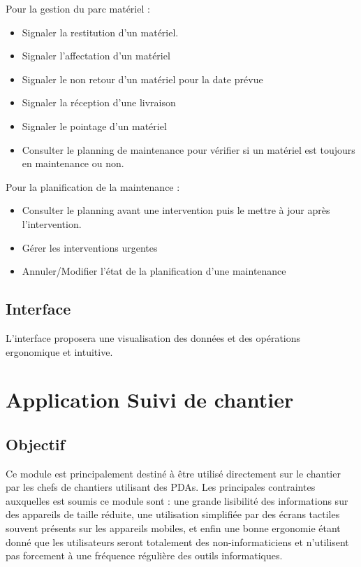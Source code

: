         Pour la gestion du parc matériel :
               \begin{itemize}
	               \item Signaler la restitution d'un matériel.
	               \item Signaler l'affectation d'un matériel
	               \item Signaler le non retour d'un matériel pour la date prévue
	               \item Signaler la réception d'une livraison
	               \item Signaler le pointage d'un matériel
	               \item Consulter le planning de maintenance pour vérifier si un matériel est toujours en maintenance ou non.
               \end{itemize}

        Pour la planification de la maintenance :
               \begin{itemize}
	               \item Consulter le planning avant une intervention puis le mettre à jour après l'intervention.
	               \item Gérer les interventions urgentes
	               \item Annuler/Modifier l'état de la planification d'une maintenance
               \end{itemize}

	\subsection{Interface}
	L'interface proposera une visualisation des données et des opérations ergonomique et intuitive.

\section {Application  Suivi de chantier}
	\subsection {Objectif}
	Ce module est principalement destiné à être utilisé directement sur le chantier par les chefs de chantiers utilisant des PDAs.
Les principales contraintes auxquelles est soumis ce module sont : une grande lisibilité des informations sur des appareils de taille réduite, une utilisation simplifiée par des écrans tactiles souvent présents sur les appareils mobiles, et enfin une bonne ergonomie étant donné que les utilisateurs
seront totalement des non-informaticiens et n'utilisent pas forcement à une fréquence régulière des outils informatiques.

